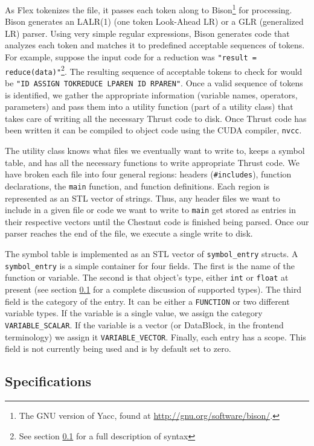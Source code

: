 \documentclass{article}
\renewcommand{\|}{\origbar} %
\newcommand{\code}[1]{\texttt{#1}}
\begin{document}
As Flex tokenizes the file, it passes each token along to Bison\footnote{The GNU version of Yacc, found at \url{http://gnu.org/software/bison/}.} for processing. Bison generates an LALR(1) (one token Look-Ahead LR) or a GLR (generalized LR) parser. Using very simple regular expressions, Bison generates code that analyzes each token and matches it to predefined acceptable sequences of tokens. For example, suppose the input code for a reduction was \code{"result = reduce(data)"}\footnote{See section \ref{sec:specifications} for a full description of syntax}. The resulting sequence of acceptable tokens to check for would be \code{"ID ASSIGN TOKREDUCE LPAREN ID RPAREN"}. Once a valid sequence of tokens is identified, we gather the appropriate information (variable names, operators, parameters) and pass them into a utility function (part of a utility class) that takes care of writing all the necessary Thrust code to disk. Once Thrust code has been written it can be compiled to object code using the CUDA compiler, \code{nvcc}.

The utility class knows what files we eventually want to write to, keeps a symbol table, and has all the necessary functions to write appropriate Thrust code. We have broken each file into four general regions: headers (\code{\#includes}), function declarations, the \code{main} function, and function definitions. Each region is represented as an STL vector of strings. Thus, any header files we want to include in a given file or code we want to write to \code{main} get stored as entries in their respective vectors until the Chestnut code is finished being parsed. Once our parser reaches the end of the file, we execute a single write to disk.

The symbol table is implemented as an STL vector of \code{symbol\_entry} structs. A \code{symbol\_entry} is a simple container for four fields. The first is the name of the function or variable. The second is that object's type, either \code{int} or \code{float} at present (see section \ref{sec:specifications} for a complete discussion of supported types). The third field is the category of the entry. It can be either a \code{FUNCTION} or two different variable types. If the variable is a single value, we assign the category \code{VARIABLE\_SCALAR}. If the variable is a vector (or DataBlock, in the frontend terminology) we assign it \code{VARIABLE\_VECTOR}. Finally, each entry has a scope. This field is not currently being used and is by default set to zero. 

\subsection{Specifications}
\label{sec:specifications}
\end{document}

